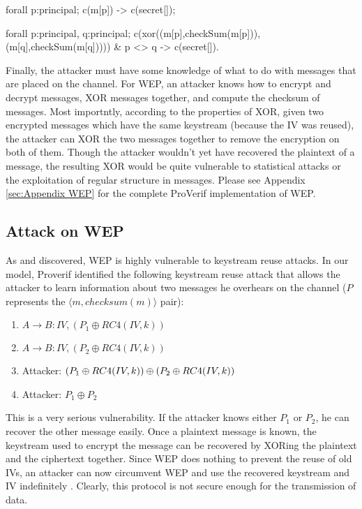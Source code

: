 \documentclass[11pt, twocolumn]{article} %
\begin{document}
{ %
forall p:principal; c(m[p]) -> c(secret[]);

\begin{verbatimtab}[4] 
forall p:principal, q:principal; 
	c(xor((m[p],checkSum(m[p])),
		(m[q],checkSum(m[q])))) 
			& p <> q -> c(secret[]).
\end{verbatimtab}

Finally, the attacker must have some knowledge of what to do with messages that are placed on the channel.  For WEP, an attacker knows how to encrypt and decrypt messages, XOR messages together, and compute the checksum of messages.  Most importntly, according to the properties of XOR, given two encrypted messages which have the same keystream (because the IV was reused), the attacker can XOR the two messages together to remove the encryption on both of them.  Though the attacker wouldn't yet have recovered the plaintext of a message, the resulting XOR would be quite vulnerable to statistical attacks or the exploitation of regular structure in messages.  Please see Appendix \ref{sec:Appendix WEP} for the complete ProVerif implementation of WEP.
\subsection{Attack on WEP}
As \cite{lafourcade10} and \cite{borisov01} discovered, WEP is highly vulnerable to keystream reuse attacks.  In our model, Proverif identified the following keystream reuse attack that allows the attacker to learn information about two messages he overhears on the channel ($P$ represents the $\langle m, checksum(m)\rangle$ pair):

\begin{enumerate}
\item $A\rightarrow B:  IV, (P_1 \oplus RC4(IV, k))$
\item $A \rightarrow B: IV, (P_2 \oplus RC4(IV, k))$
\item Attacker: $(P_1 \oplus RC4(IV, k)) \oplus \\(P_2 \oplus RC4(IV, k))$
\item Attacker: $P_1 \oplus P_2$
\end{enumerate}

This is a very serious vulnerability.  If the attacker knows either $P_1$ or $P_2$, he can recover the other message easily.  Once a plaintext message is known, the keystream used to encrypt the message can be recovered by XORing the plaintext and the ciphertext together.  Since WEP does nothing to prevent the reuse of old IVs, an attacker can now circumvent WEP and use the recovered keystream and IV indefinitely \cite{borisov01}.  Clearly, this protocol is not secure enough for the transmission of data.


}
\end{document}
